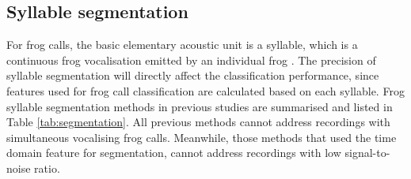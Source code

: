 \subsection{Syllable segmentation}
For frog calls, the basic elementary acoustic unit is a syllable, which is a continuous frog vocalisation emitted by an individual frog \citep{huang2009frog}. The precision of syllable segmentation will directly affect the classification performance, since features used for frog call classification are calculated based on each syllable. Frog syllable segmentation methods in previous studies are summarised and listed in Table \ref{tab:segmentation}. All previous methods cannot address recordings with simultaneous vocalising frog calls. Meanwhile, those methods that used the time domain feature for segmentation, cannot address recordings with low signal-to-noise ratio. 


  
\begin{table}[htb!]
\centering
\caption[Summary of related work]{Summary of related work for frog syllable segmentation. Here, E denotes energy, ZCR denotes zero-crossing rate.}
\label{tab:segmentation}
\end{table}




